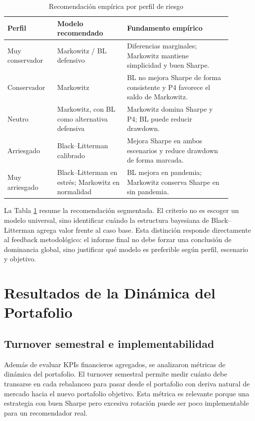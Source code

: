 \documentclass[11pt]{article}
\begin{document}
\begin{table}[H]
\centering
\caption{Recomendaci\'on emp\'irica por perfil de riesgo}
\label{tab:recomendacion_perfil}
\begin{tabular}{p{0.20\linewidth} p{0.28\linewidth} p{0.42\linewidth}}
\toprule
Perfil & Modelo recomendado & Fundamento emp\'irico \\
\midrule
Muy conservador & Markowitz / BL defensivo & Diferencias marginales; Markowitz mantiene simplicidad y buen Sharpe. \\
Conservador & Markowitz & BL no mejora Sharpe de forma consistente y P4 favorece el saldo de Markowitz. \\
Neutro & Markowitz, con BL como alternativa defensiva & Markowitz domina Sharpe y P4; BL puede reducir drawdown. \\
Arriesgado & Black--Litterman calibrado & Mejora Sharpe en ambos escenarios y reduce drawdown de forma marcada. \\
Muy arriesgado & Black--Litterman en estr\'es; Markowitz en normalidad & BL mejora en pandemia; Markowitz conserva Sharpe en sin pandemia. \\
\bottomrule
\end{tabular}
\end{table}

La Tabla \ref{tab:recomendacion_perfil} resume la recomendaci\'on segmentada. El criterio no es escoger un modelo universal, sino identificar cu\'ando la estructura bayesiana de Black--Litterman agrega valor frente al caso base. Esta distinci\'on responde directamente al feedback metodol\'ogico: el informe final no debe forzar una conclusi\'on de dominancia global, sino justificar qu\'e modelo es preferible seg\'un perfil, escenario y objetivo.

\section{Resultados de la Din\'amica del Portafolio}

\subsection{Turnover semestral e implementabilidad}

Adem\'as de evaluar KPIs financieros agregados, se analizaron m\'etricas de din\'amica del portafolio. El turnover semestral permite medir cu\'anto debe transarse en cada rebalanceo para pasar desde el portafolio con deriva natural de mercado hacia el nuevo portafolio objetivo. Esta m\'etrica es relevante porque una estrategia con buen Sharpe pero excesiva rotaci\'on puede ser poco implementable para un recomendador real.
\end{document}
